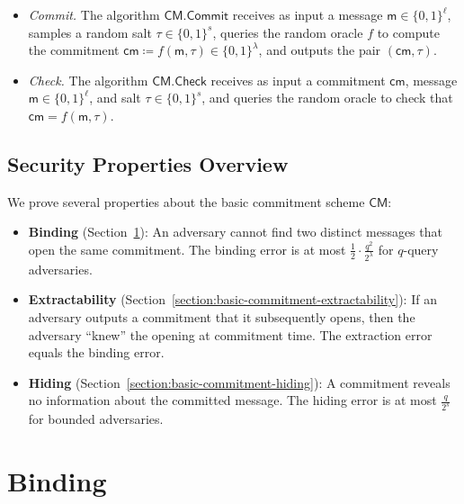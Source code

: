 \documentclass{article}
\newcommand{\Bits}{\{0,1\}}
\newcommand{\DefineEqual}{\coloneqq}
\newcommand{\ROFunction}{f}
\newcommand{\ROOutputSize}{\lambda}
\newcommand{\ROQueryBound}{q}
\newcommand{\ProtoSalt}{\tau}
\newcommand{\CMSymbol}{\mathsf{CM}}
\newcommand{\CMCommit}{\CMSymbol.\mathsf{Commit}}
\newcommand{\CMCheck}{\CMSymbol.\mathsf{Check}}
\newcommand{\CMMessageLength}{\ell}
\newcommand{\CMSaltSize}{s}
\newcommand{\CMCommitment}{\mathsf{cm}}
\newcommand{\CMMessage}{\mathsf{m}}
\newcommand{\CMSaltString}{\ProtoSalt}
\newcommand{\CMBindingExpression}[2]{\frac{1}{2} \cdot \frac{#2^2}{2^{#1}}}
\newcommand{\CMHidingExpressionFinite}[2]{\frac{#2}{2^{#1}}}
\begin{document}
\begin{itemize}
  \item \emph{Commit.}
  The algorithm $\CMCommit$ receives as input a message $\CMMessage \in \Bits^{\CMMessageLength}$, samples a random salt $\CMSaltString \in \Bits^{\CMSaltSize}$, queries the random oracle $\ROFunction$ to compute the commitment $\CMCommitment \DefineEqual \ROFunction(\CMMessage,\CMSaltString) \in \Bits^{\ROOutputSize}$, and outputs the pair $(\CMCommitment,\CMSaltString)$.

  \item \emph{Check.}
  The algorithm $\CMCheck$ receives as input a commitment $\CMCommitment$, message $\CMMessage \in \Bits^{\CMMessageLength}$, and salt $\CMSaltString \in \Bits^{\CMSaltSize}$, and queries the random oracle to check that $\CMCommitment = \ROFunction(\CMMessage,\CMSaltString)$.
\end{itemize}

\subsection{Security Properties Overview}

We prove several properties about the basic commitment scheme $\CMSymbol$:
\begin{itemize}
  \item \textbf{Binding} (Section~\ref{section:basic-commitment-binding}): An adversary cannot find two distinct messages that open the same commitment. The binding error is at most $\CMBindingExpression{\ROOutputSize}{\ROQueryBound}$ for $\ROQueryBound$-query adversaries.

  \item \textbf{Extractability} (Section~\ref{section:basic-commitment-extractability}): If an adversary outputs a commitment that it subsequently opens, then the adversary ``knew'' the opening at commitment time. The extraction error equals the binding error.

  \item \textbf{Hiding} (Section~\ref{section:basic-commitment-hiding}): A commitment reveals no information about the committed message. The hiding error is at most $\CMHidingExpressionFinite{\CMSaltSize}{\ROQueryBound}$ for bounded adversaries.
\end{itemize}

\section{Binding}
\label{section:basic-commitment-binding}
\end{document}
